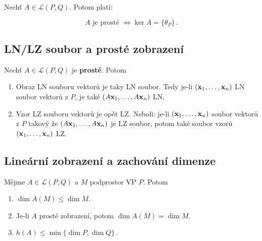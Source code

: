 Nechť $A\in\mathcal L(P,Q)$. Potom platí:

\[ A\text{ je prosté }\Leftrightarrow \ker A=\{\theta_P\}\,. \]

\subsection*{LN/LZ soubor a prosté zobrazení}

Nechť $A\in\mathcal L(P,Q)$ je \textbf{prosté}. Potom

\begin{enumerate}
      \item Obraz LN souboru vektorů je taky LN soubor. Tedy je-li $(\mathbf{x}_1,\dots,\mathbf{x}_n)$ LN
            soubor vektorů z $P$, je také $(A\mathbf{x}_1,\dots,A\mathbf{x}_n)$ LN.
      \item Vzor LZ souboru vektorů je opět LZ. Neboli: je-li $(\mathbf{x}_1,\dots,\mathbf{x}_n)$ soubor
            vektorů z $P$ takový že $(A\mathbf{x}_1,\dots,A\mathbf{x}_n)$ je LZ soubor, potom také soubor
            vzorů $(\mathbf{x}_1,\dots,\mathbf{x}_n)$ LZ.
\end{enumerate}

\subsection*{Lineární zobrazení a zachování dimenze}

Mějme $A\in \mathcal L(P,Q)$ a $M$ podprostor VP $P$. Potom

\begin{enumerate}
      \item $\dim A(M) \leq \dim M$.
      \item Je-li $A$ prosté zobrazení, potom $\dim A(M) = \dim M$.
      \item $h(A)\leq \min \{\dim P, \dim Q\}\,.$
\end{enumerate}

\pagebreak
